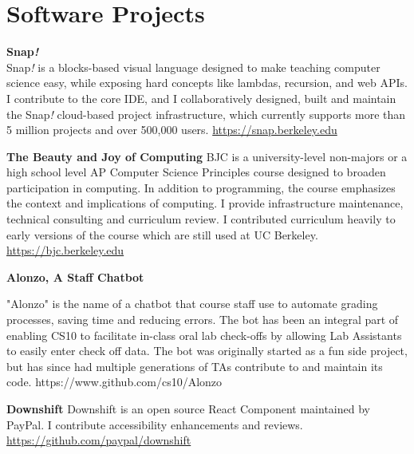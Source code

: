 \section{Software Projects}

\vspace{6pt}

\textbf{Snap\textit{!}}\\
\small Snap\textit{!} is a blocks-based visual language designed to make teaching computer science easy, while exposing hard concepts like lambdas, recursion, and web APIs. I contribute to the core IDE, and I collaboratively designed, built and maintain the Snap\textit{!} cloud-based project infrastructure, which currently supports more than 5 million projects and over 500,000 users.
\newline
\small{\href{https://snap.berkeley.edu}{https://snap.berkeley.edu}}

\vspace{12pt}

\textbf{The Beauty and Joy of Computing}
\newline
\small BJC is a university-level non-majors or a high school level AP Computer Science Principles course designed to broaden participation in computing. In addition to programming, the course emphasizes the context and implications of computing. I provide infrastructure maintenance, technical consulting and curriculum review. I contributed curriculum heavily to early versions of the course which are still used at UC Berkeley.
\newline
\small{\href{https://bjc.berkeley.edu}{https://bjc.berkeley.edu}}

\vspace{12pt}

\textbf{Alonzo, A Staff Chatbot}

\vspace{3pt}

\small{"Alonzo" is the name of a chatbot that course staff use to automate grading processes, saving time and reducing errors. The bot has been an integral part of enabling CS10 to facilitate in-class oral lab check-offs by allowing Lab Assistants to easily enter check off data. The bot was originally started as a fun side project, but has since had multiple generations of TAs contribute to and maintain its code.}
\linebreak
\small{https://www.github.com/cs10/Alonzo}

\vspace{12pt}
\textbf{Downshift}
\newline
\small{Downshift is an open source React Component maintained by PayPal. I contribute accessibility enhancements and reviews.}
\newline
\small{\href{https://github.com/paypal/downshift}{https://github.com/paypal/downshift}}

\vspace{15pt}

